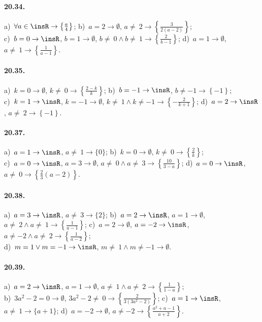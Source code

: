 \paragraph{20.34.}
a)~$\forall a\in \insR \rightarrow \left\{\frac{a}{4}\right\}$;
\quad b)~$a=2 \rightarrow \emptyset$, $a\neq~2 \rightarrow \left\{\frac{3}{2(a-2)}\right\}$;
\quad \protect\\
c)~$b=0 \rightarrow \insR$, $b=1\rightarrow\emptyset$, $b\neq~0\wedge b\neq~1\rightarrow \left\{\frac{2}{b-1}\right\}$;
\quad d)~$a=1\rightarrow \emptyset$, $a\neq~1\rightarrow \left\{\frac{1}{a-1}\right\}$.

\paragraph{20.35.}
a)~$k=0 \rightarrow \emptyset$, $k\neq~0 \rightarrow \left\{\frac{2-k}{k}\right\}$;
\quad b)~$b=-1 \rightarrow \insR$, $b\neq -1 \rightarrow \left\{-1\right\}$;
\quad \protect\\
c)~$k=1 \rightarrow \insR$, $k=-1 \rightarrow \emptyset$, $k\neq~1\wedge k\neq -1 \rightarrow \left\{-{\frac{2}{k+1}}\right\}$;
\quad d)~$a=2 \rightarrow \insR$, $a\neq~2 \rightarrow \left\{-1\right\}$.

\paragraph{20.37.}
a)~$a=1 \rightarrow \insR$, $a\neq~1 \rightarrow \{0\}$;
\quad b)~$k=0 \rightarrow \emptyset$, $k\neq~0 \rightarrow \left\{\frac{2}{k}\right\}$;
\quad \protect\\
c)~$a=0 \rightarrow \insR$, $a=3\rightarrow \emptyset$, $a\neq~0 \wedge a\neq~3 \rightarrow \left\{\frac{10}{3-a}\right\}$;
\quad d)~$a=0 \rightarrow \insR$, $a\neq~0 \rightarrow \left\{\frac{2}{3} (a-2)\right\}$.

\paragraph{20.38.}
a)~$a=3 \rightarrow \insR$, $a\neq~3 \rightarrow \{2\}$;
\quad b)~$a=2 \rightarrow \insR$, $a=1 \rightarrow \emptyset$, $a\neq~2\wedge a\neq~1 \rightarrow \left\{\frac{1}{a-1}\right\}$;
\quad c)~$a=2 \rightarrow \emptyset$, $a=-2 \rightarrow \insR$, $a\neq -2\wedge a\neq~2 \rightarrow \left\{\frac{1}{a-2}\right\}$;
\quad\protect\\
d)~$m=1\vee m=-1 \rightarrow \insR$, $m\neq~1\wedge m\neq -1 \rightarrow \emptyset$.

\paragraph{20.39.}
a)~$a=2 \rightarrow \insR$, $a=1 \rightarrow \emptyset$, $a\neq~1\wedge a\neq~2 \rightarrow \left\{\frac{1}{1-a}\right\}$;
\quad\protect\\
b)~$3a^{2}-2=0 \rightarrow \emptyset$, $3a^{2}-2\neq~0 \rightarrow \left\{\frac{2}{3(3a^{2}-2)}\right\}$;
\quad c)~$a=1 \rightarrow \insR$, $a\neq~1 \rightarrow \{a+1\}$;
\quad d)~$a=-2 \rightarrow \emptyset$, $a\neq -2 \rightarrow \left\{\frac{a^{2}+a-1}{a+2}\right\}$.

